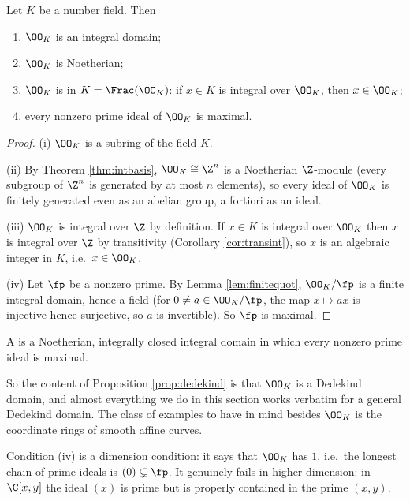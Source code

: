 \begin{proposition}\label{prop:dedekind}
	Let $K$ be a number field. Then
	\begin{enumerate}[label=(\roman*)]
		\item $\OO_K$ is an integral domain;
		\item $\OO_K$ is Noetherian;
		\item $\OO_K$ is  in $K = \Frac(\OO_K)$: if $x \in K$ is integral over $\OO_K$, then $x \in \OO_K$;
		\item every nonzero prime ideal of $\OO_K$ is maximal.
	\end{enumerate}
\end{proposition}

\begin{proof}
	(i) $\OO_K$ is a subring of the field $K$.

	(ii) By Theorem \ref{thm:intbasis}, $\OO_K \cong \Z^n$ is a Noetherian $\Z$-module (every subgroup of $\Z^n$ is generated by at most $n$ elements), so every ideal of $\OO_K$ is finitely generated even as an abelian group, a fortiori as an ideal.

	(iii) $\OO_K$ is integral over $\Z$ by definition. If $x \in K$ is integral over $\OO_K$ then $x$ is integral over $\Z$ by transitivity (Corollary \ref{cor:transint}), so $x$ is an algebraic integer in $K$, i.e.\ $x \in \OO_K$.

	(iv) Let $\fp$ be a nonzero prime. By Lemma \ref{lem:finitequot}, $\OO_K/\fp$ is a finite integral domain, hence a field (for $0 \neq a \in \OO_K/\fp$, the map $x \mapsto ax$ is injective hence surjective, so $a$ is invertible). So $\fp$ is maximal.
\end{proof}

\begin{definition}
	A  is a Noetherian, integrally closed integral domain in which every nonzero prime ideal is maximal.
\end{definition}

So the content of Proposition \ref{prop:dedekind} is that $\OO_K$ is a Dedekind domain, and almost everything we do in this section works verbatim for a general Dedekind domain. The class of examples to have in mind besides $\OO_K$ is the coordinate rings of smooth affine curves.

\begin{remark}
	Condition (iv) is a dimension condition: it says that $\OO_K$ has  $1$, i.e.\ the longest chain of prime ideals is $(0) \subsetneq \fp$. It genuinely fails in higher dimension: in $\C[x,y]$ the ideal $(x)$ is prime but is properly contained in the prime $(x,y)$.
\end{remark}

